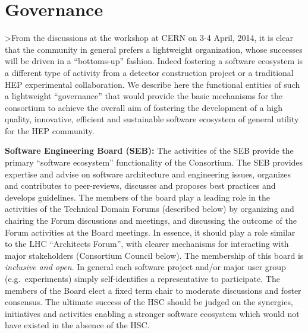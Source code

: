 \documentclass[12pt,letterpaper,fleqn]{article}
\begin{document}


\section{Governance}
\label{sec:governance}

>From the discussions at the workshop at CERN on 3-4 April, 2014, it
is clear that the community in general prefers a lightweight
organization, whose successes will be driven in a ``bottoms-up''
fashion. Indeed fostering a software ecosystem is a different
type of activity from a detector construction project or a traditional
HEP experimental collaboration. We describe here the functional
entities of such a lightweight ``governance'' that would provide
the basic mechanisms for the consortium to achieve the overall
aim of fostering the development of a high quality,
innovative, efficient and sustainable software ecosystem of general
utility for the HEP community.

{\bf Software Engineering Board (SEB):} The activities of the SEB provide the primary ``software ecosystem'' functionality of the Consortium.  
The SEB provides expertise and advise on software architecture and engineering issues, organizes and contributes to peer-reviews,
discusses and proposes best practices and develops guidelines.
The members of the board play a leading role in the activities of
the Technical Domain Forums (described below) by organizing and chairing the Forum discussions and meetings, and discussing the outcome
of the Forum activities at the Board meetings. In essence, it should 
play a role similar to the LHC ``Architects Forum'', with clearer
mechanisms for interacting with major stakeholders (Consortium Council
below).
The membership of this board is {\em inclusive and open}. In general each software project and/or major user group (e.g.\ experiments) simply self-identifies a representative to participate. The members of the Board elect a fixed term chair to moderate discussions and foster consensus.
The ultimate success of the HSC should be judged on the synergies,
initiatives and activities enabling a stronger software ecosystem
which would not have existed in the absence of the HSC.
\end{document}
